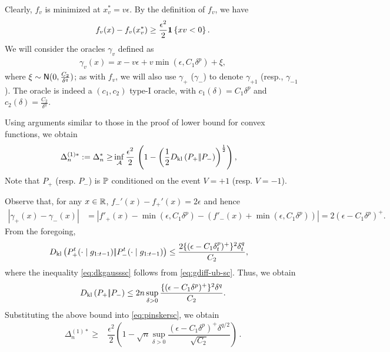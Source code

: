 Clearly, $f_v$ is minimized at $x^*_v = v\epsilon$.
By the definition of $f_v$, we have
\begin{align}
  f_v(x) - f_v(x^*_v)
\ge  \dfrac{\epsilon^2}{2}  \indic{x v  < 0}. \label{eq:fv-lb-sc}
\end{align}
We will consider the oracles $\gamma_v$ defined as 
\begin{align}
 \gamma_v(x) = x-v\epsilon + v \min(\epsilon,C_1 \delta^p) + \xi, \label{eq:oracle-1d}
\end{align}
where $\xi \sim \normal(0,\frac{C_2}{\delta^q})$; as with $f_v$, we will also use $\gamma_{+}$ ($\gamma_-$) 
to denote $\gamma_{+1}$ (resp., $\gamma_{-1}$).
The oracle is indeed a $(c_1,c_2)$ type-I oracle, with $c_1(\delta)=C_1\delta^p$ and $c_2(\delta)=\frac{C_2}{\delta^q}$.

Using arguments similar to those in the proof of lower bound for convex functions, we obtain
\begin{align}
\Delta_n^{(1)*}:=\Delta_n^{*} %
  \ge  &\inf_{\A} \dfrac{\epsilon^2 }{2}  \,\left( 1 - \left(\frac12\dkl{P_{+}}{P_{-}}\right)^{\frac{1}{2}}\right), \label{eq:pinskersc}
\end{align}
Note that $P_+$ (resp. $P_-$) is $\P$ conditioned on the event $V=+1$ (resp. $V=-1$).

Observe that, for any $x\in \R$, $f_-'(x) - f_+'(x) = 2\epsilon$ and hence
\begin{align}
 |\gamma_+(x) - \gamma_-(x)| 
& = | f'_+(x) - \min(\epsilon,C_1 \delta^p) - (f'_-(x)+\min(\epsilon,C_1 \delta^p)) | 
 = 2 (\epsilon - C_1 \delta^p)^+.
 \label{eq:gdiff-ub-sc}
\end{align}
From the foregoing, 
\begin{align}
 \MoveEqLeft \dkl{P_{+}^t(\cdot\mid g_{1:t-1})}{P_{-}^t(\cdot\mid g_{1:t-1})}
 \le  \dfrac{2\{(\epsilon-C_1\delta_t^p)^+\}^2\delta_t^q}{{C_2}},\label{eq:dkgausssc}
\end{align}
where the inequality \eqref{eq:dkgausssc} follows from \eqref{eq:gdiff-ub-sc}.
Thus, we obtain
\begin{align}
\dkl{P_{+}}{P_{-}} \le 2n \sup_{\delta>0} \dfrac{\{(\epsilon-C_1\delta^p)^+\}^2 \delta^q}{C_2}.
\label{eq:kluboundsc}
\end{align}
Substituting the above bound into \eqref{eq:pinskersc}, we obtain 
\begin{align}
 \Delta_n^{(1)*}
  \ge & \dfrac{\epsilon^2}{2} \left(1 - \sqrt{
    n}  \sup_{\delta>0}\dfrac{(\epsilon-C_1\delta^p)^+\delta^{q/2}}{\sqrt{C_2}}
  \right)\,.\label{eq:final-lower-bd-sc}
\end{align}


